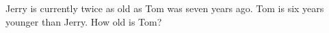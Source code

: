 Jerry is currently twice as old as Tom was seven years ago. Tom is six years younger than Jerry. How old is Tom?
